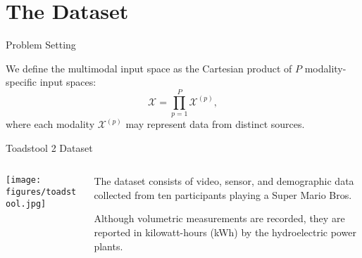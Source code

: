 \section{The Dataset}

\begin{frame}{Problem Setting}
	\begin{block}{}
		We define the multimodal input space as the Cartesian product of $P$ modality-specific input spaces:
		\[
		\mathcal{X} = \prod_{p=1}^{P} \mathcal{X}^{(p)},
		\]
		where each modality $\mathcal{X}^{(p)}$ may represent data from distinct sources.
	\end{block}
	
\end{frame}



\begin{frame}{Toadstool 2 Dataset}
		\begin{columns}[T] %
		\begin{column}{0.45\textwidth}
			\texttt{[image: figures/toadstool.jpg]}
			
		\end{column}
		\begin{column}{0.55\textwidth}
			\begin{block}{}
				The dataset consists of video, sensor, and demographic data collected from ten participants playing a Super Mario Bros. 
			\end{block}

			\begin{block}{}
				Although volumetric measurements are recorded, they are reported in kilowatt-hours (kWh) by the hydroelectric power plants.
			\end{block}
		\end{column}
	\end{columns}
\end{frame}